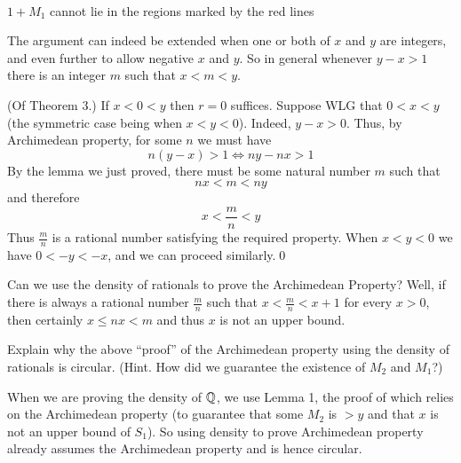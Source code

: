 \begin{smrg}
\begin{center}
\\
$1 + M_1$ cannot lie in the regions marked by the red lines
\end{center}
\end{smrg}
\begin{SNP}{\rmk}{The argument can indeed be extended when one or both of $x$ and $y$ are integers, and even further to allow negative $x$ and $y$. So in general whenever $y - x > 1$ there is an integer $m$ such that $x < m < y$.}
\end{SNP}

\begin{smrg}
\pf (Of Theorem 3.) If $x < 0 < y$ then $r = 0$ suffices. Suppose WLG that $0 < x < y$ (the symmetric case being when $x < y < 0$). Indeed, $y - x > 0$. Thus, by Archimedean property, for some $n$ we must have
$$
n(y - x) > 1
\iff ny - nx > 1
$$
By the lemma we just proved, there must be some natural number $m$ such that
$$
nx < m < ny
$$
and therefore
$$
x < \dfrac{m}{n} < y
$$
Thus $\frac{m}{n}$ is a rational number satisfying the required property. When $x < y < 0$ we have $0 < -y < -x$, and we can proceed similarly.\qed
\end{smrg}
Can we use the density of rationals to prove the Archimedean Property? Well, if there is always a rational number $\frac{m}{n}$ such that $x < \frac{m}{n} < x + 1$ for every $x > 0$, then certainly $x \leq nx < m$ and thus $x$ is not an upper bound.
\begin{SNP}{\ex}{Explain why the above ``proof'' of the Archimedean property using the density of rationals is circular. (Hint. How did we guarantee the existence of $M_2$ and $M_1$?)}
\end{SNP}

\AnswerSection
\ans When we are proving the density of $\mathbb{Q}$, we use Lemma 1, the proof of which relies on the Archimedean property (to guarantee that some $M_2$ is $> y$ and that $x$ is not an upper bound of $S_1$). So using density to prove Archimedean property already assumes the Archimedean property and is hence circular. 

